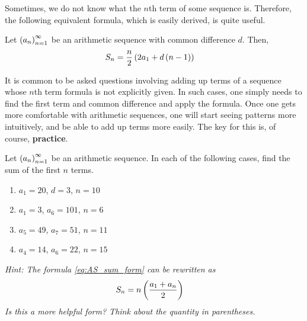 Sometimes, we do not know what the $n$th term of some sequence is. Therefore, the following equivalent formula, which is easily derived, is quite useful.
\begin{boxexercise}
Let $\left( a_n \right)_{n=1}^{\infty}$ be an arithmetic sequence with common difference $d$. Then,
\begin{align}
    S_n &= \frac{n}{2}\left( 2a_1 + d\left( n-1 \right) \right)
\end{align}
\end{boxexercise}
It is common to be asked questions involving adding up terms of a sequence whose $n$th term formula is not explicitly given. In such cases, one simply needs to find the first term and common difference and apply the formula. Once one gets more comfortable with arithmetic sequences, one will start seeing patterns more intuitively, and be able to add up terms more easily. The key for this is, of course, \textbf{practice}.
\begin{boxexercise}
    Let $\left( a_n \right)_{n=1}^{\infty}$ be an arithmetic sequence. In each of the following cases, find the sum of the first $n$ terms.
    \begin{enumerate}[noitemsep]
        \item $a_1 = 20$, $d = 3$, $n = 10$
        \item $a_1 = 3$, $a_6 = 101$, $n = 6$
        \item $a_5 = 49$, $a_{7} = 51$, $n = 11$
        \item $a_4 = 14$, $a_6 = 22$, $n = 15$
    \end{enumerate}
    \textit{Hint: The formula \eqref{eq:AS_sum_form} can be rewritten as
    \begin{align*}
        S_n &= n\left( \frac{a_1 + a_n}{2} \right)   
    \end{align*}
    Is this a more helpful form? Think about the quantity in parentheses.}
\end{boxexercise}